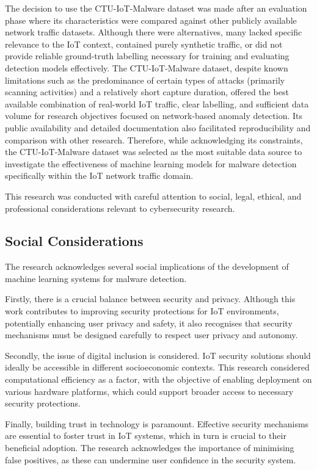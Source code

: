 The decision to use the CTU-IoT-Malware dataset was made after an evaluation phase where its characteristics were compared against other publicly available network traffic datasets. Although there were alternatives, many lacked specific relevance to the IoT context, contained purely synthetic traffic, or did not provide reliable ground-truth labelling necessary for training and evaluating detection models effectively. The CTU-IoT-Malware dataset, despite known limitations such as the predominance of certain types of attacks (primarily scanning activities) and a relatively short capture duration, offered the best available combination of real-world IoT traffic, clear labelling, and sufficient data volume for research objectives focused on network-based anomaly detection. Its public availability and detailed documentation also facilitated reproducibility and comparison with other research. Therefore, while acknowledging its constraints, the CTU-IoT-Malware dataset was selected as the most suitable data source to investigate the effectiveness of machine learning models for malware detection specifically within the IoT network traffic domain.

This research was conducted with careful attention to social, legal, ethical, and professional considerations relevant to cybersecurity research.

\subsection{Social Considerations}

The research acknowledges several social implications of the development of machine learning systems for malware detection.

Firstly, there is a crucial balance between security and privacy. Although this work contributes to improving security protections for IoT environments, potentially enhancing user privacy and safety, it also recognises that security mechanisms must be designed carefully to respect user privacy and autonomy.

Secondly, the issue of digital inclusion is considered. IoT security solutions should ideally be accessible in different socioeconomic contexts. This research considered computational efficiency as a factor, with the objective of enabling deployment on various hardware platforms, which could support broader access to necessary security protections.

Finally, building trust in technology is paramount. Effective security mechanisms are essential to foster trust in IoT systems, which in turn is crucial to their beneficial adoption. The research acknowledges the importance of minimising false positives, as these can undermine user confidence in the security system.

